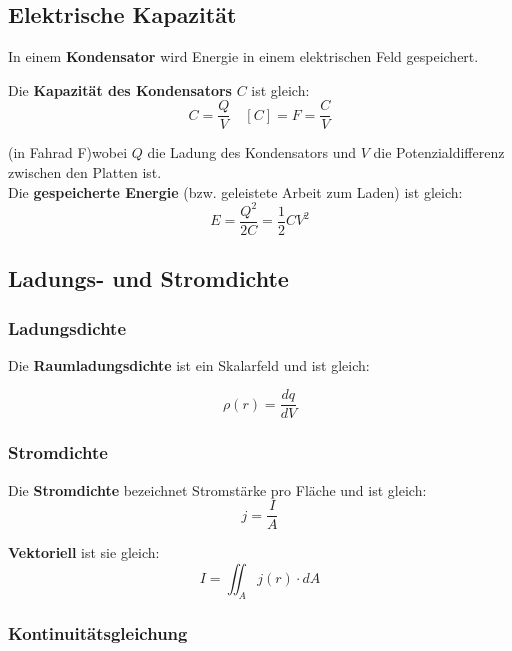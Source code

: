 \documentclass[7pt]{article}
\begin{document}
\begin{multicols*}{3}
\subsection{Elektrische Kapazit{\"a}t}

In einem \textbf{Kondensator} wird Energie in einem elektrischen Feld gespeichert.

Die \textbf{Kapazit{\"a}t des Kondensators} $C$ ist gleich:
\begin{equation*}
	C = \frac{Q}{V} \quad [C] = F = \frac{C}{V}
\end{equation*}

(in Fahrad F)wobei $Q$ die Ladung des Kondensators und $V$ die Potenzialdifferenz zwischen den Platten ist. \\

Die \textbf{gespeicherte Energie} (bzw. geleistete Arbeit zum Laden) ist gleich:
\begin{equation*}
	E = \frac{Q^2}{2C} = \frac{1}{2}CV^2
\end{equation*}

\subsection{Ladungs- und Stromdichte}

\subsubsection{Ladungsdichte}

Die \textbf{Raumladungsdichte} ist ein Skalarfeld und ist gleich:

\begin{equation*}
	\rho(r) = \frac{dq}{dV}
\end{equation*}

\subsubsection{Stromdichte}

Die \textbf{Stromdichte} bezeichnet Stromst{\"a}rke pro Fl{\"a}che und ist gleich:
\begin{equation*}
	j = \frac{I}{A}
\end{equation*}

\textbf{Vektoriell} ist sie gleich:
\begin{equation*}
	I = \iint_A j(r)\cdot dA
\end{equation*}

\subsubsection{Kontinuit{\"a}tsgleichung}


\end{multicols*}
\end{document}
